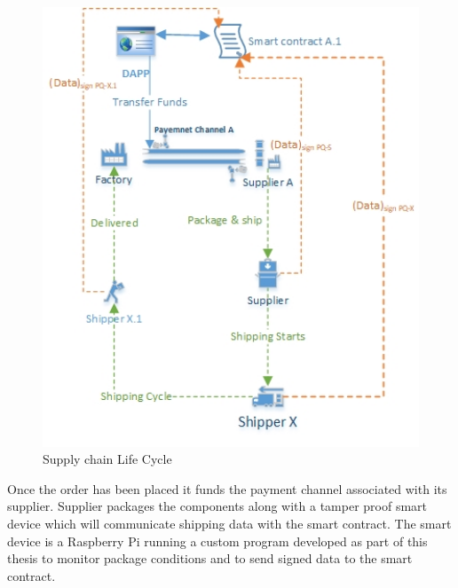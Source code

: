 \begin{figure}[h]
	\centering
    \includegraphics[width=140mm,scale=1]{figs/monitoring_subdiag}
	\caption{Supply chain Life Cycle}
	\label{fig:monitoring_subdiag} 
\end{figure}

Once the order has been placed it funds the payment channel associated with its supplier. Supplier packages the components along with a tamper proof smart device which will communicate shipping data with the smart contract. The smart device is a Raspberry Pi running a custom program developed as part of this thesis to monitor package conditions and to send signed data to the smart contract. 

